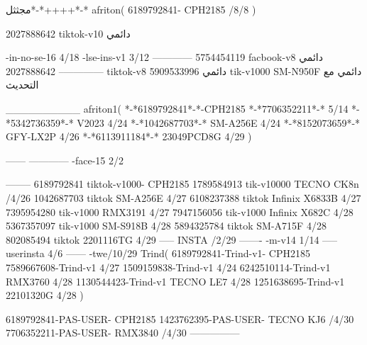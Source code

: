 مجثثل*-*++++*-*
afriton(
6189792841- CPH2185  /8/8
)

2027888642 tiktok-v10
دائمي

-in-no-se-16 4/18
-lse-ins-v1 3/12
------------
5754454119 facbook-v8
دائمي
--------------
2027888642 tiktok-v8
دائمي
5909533996 tik-v1000  SM-N950F
دائمي مع التحديث

__________
afriton1(
*-*6189792841*-*-CPH2185
*-*7706352211*-* 5/14
*-*5342736359*-* V2023 4/24
*-*1042687703*-* SM-A256E 4/24
*-*8152073659*-* GFY-LX2P 4/26
*-*6113911184*-* 23049PCD8G 4/29
)


------
------------
-face-15 2/2

--------
6189792841 tiktok-v1000- CPH2185 
1789584913 tik-v10000 TECNO CK8n /4/26
1042687703 tiktok SM-A256E 4/27
6108237388 tiktok  Infinix X6833B 4/27
7395954280 tik-v1000  RMX3191 4/27
7947156056 tik-v1000  Infinix X682C 4/28
5367357097 tik-v1000  SM-S918B 4/28
5894325784 tiktok SM-A715F  4/28
802085494 tiktok 2201116TG  4/29
-----
 INSTA /2/29
-------
-m-v14 1/14
-----
userinsta 4/6
------
-twe/10/29
Trind(
6189792841-Trind-v1- CPH2185 
7589667608-Trind-v1  4/27
1509159838-Trind-v1  4/24
6242510114-Trind-v1 RMX3760 4/28
1130544423-Trind-v1 TECNO LE7 4/28
1251638695-Trind-v1 22101320G 4/28
)

6189792841-PAS-USER- CPH2185 
1423762395-PAS-USER- TECNO KJ6 /4/30
7706352211-PAS-USER- RMX3840 /4/30
    ---------------
